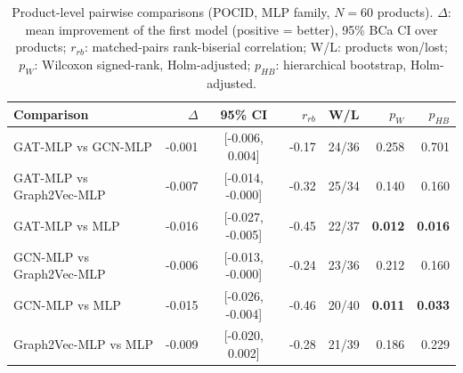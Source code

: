 \begin{table}[ht]
\centering\small
\caption{Product-level pairwise comparisons (POCID, MLP family, $N=60$ products). $\Delta$: mean improvement of the first model (positive = better), 95\% BCa CI over products; $r_{rb}$: matched-pairs rank-biserial correlation; W/L: products won/lost; $p_{W}$: Wilcoxon signed-rank, Holm-adjusted; $p_{HB}$: hierarchical bootstrap, Holm-adjusted.}
\label{tab:pairwise_pocid_mlp}
\begin{tabular}{lrcrcrr}
\toprule
Comparison & $\Delta$ & 95\% CI & $r_{rb}$ & W/L & $p_{W}$ & $p_{HB}$ \\
\midrule
GAT-MLP vs GCN-MLP & -0.001 & [-0.006, 0.004] & -0.17 & 24/36 & 0.258 & 0.701 \\
GAT-MLP vs Graph2Vec-MLP & -0.007 & [-0.014, -0.000] & -0.32 & 25/34 & 0.140 & 0.160 \\
GAT-MLP vs MLP & -0.016 & [-0.027, -0.005] & -0.45 & 22/37 & \textbf{0.012} & \textbf{0.016} \\
GCN-MLP vs Graph2Vec-MLP & -0.006 & [-0.013, -0.000] & -0.24 & 23/36 & 0.212 & 0.160 \\
GCN-MLP vs MLP & -0.015 & [-0.026, -0.004] & -0.46 & 20/40 & \textbf{0.011} & \textbf{0.033} \\
Graph2Vec-MLP vs MLP & -0.009 & [-0.020, 0.002] & -0.28 & 21/39 & 0.186 & 0.229 \\
\bottomrule
\end{tabular}
\end{table}

